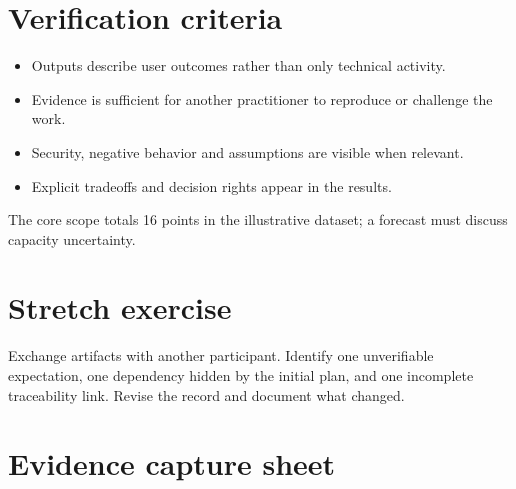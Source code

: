 \documentclass[11pt,letterpaper]{article}
\begin{document}
\section{Verification criteria}
\begin{itemize}[leftmargin=*,itemsep=2pt]
\item Outputs describe user outcomes rather than only technical activity.
\item Evidence is sufficient for another practitioner to reproduce or challenge the work.
\item Security, negative behavior and assumptions are visible when relevant.
\item Explicit tradeoffs and decision rights appear in the results.
\end{itemize}
\begin{tcolorbox}[colback=amberback,colframe=navy,title={Instructor note / expected reasoning},breakable]
The core scope totals 16 points in the illustrative dataset; a forecast must discuss capacity uncertainty.

\end{tcolorbox}
\section{Stretch exercise}
Exchange artifacts with another participant. Identify one unverifiable expectation, one dependency hidden by the initial plan, and one incomplete traceability link. Revise the record and document what changed.

\section{Evidence capture sheet}
\end{document}
